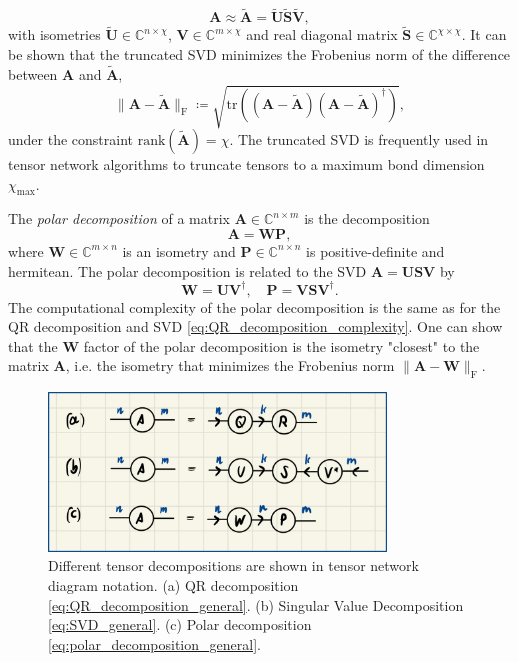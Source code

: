 \begin{equation}
	\label{eq:truncated_SVD_general}
	\bm{A} \approx \tilde{\bm{A}} = \tilde{\bm{U}}\tilde{\bm{S}}\tilde{\bm{V}},
\end{equation}
with isometries $\tilde{\bm{U}}\in\mathbb{C}^{n\times\chi}$, $\bm{V}\in\mathbb{C}^{m\times\chi}$ and real diagonal matrix $\tilde{\bm{S}}\in\mathbb{C}^{\chi\times\chi}$. It can be shown \cite{cite:eckart_young_theorem} that the truncated SVD minimizes the Frobenius norm of the difference between $\bm{A}$ and $\tilde{\bm{A}}$,
\begin{equation}
	\lVert \bm{A} - \bm{\tilde{A}} \rVert_\text{F} \coloneqq \sqrt{\text{tr}\left(\left(\bm{A}-\tilde{\bm{A}}\right)\left(\bm{A}-\tilde{\bm{A}}\right)^\dagger\right)},
\end{equation}
under the constraint $\text{rank}(\tilde{\bm{A}}) = \chi$. The truncated SVD is frequently used in tensor network algorithms to truncate tensors to a maximum bond dimension $\chi_\text{max}$. \par
The \textit{polar decomposition} of a matrix $\bm{A} \in \mathbb{C}^{n\times m}$ is the decomposition
\begin{equation}
	\label{eq:polar_decomposition_general}
	\bm{A} = \bm{W}\bm{P},
\end{equation}
where $\bm{W}\in\mathbb{C}^{m\times n}$ is an isometry and $\bm{P}\in\mathbb{C}^{n\times n}$ is positive-definite and hermitean. The polar decomposition is related to the SVD $\bm{A} = \bm{U}\bm{S}\bm{V}$ by
\begin{equation}
	\label{eq:polar_decomposition_connection_to_svd}
	\bm{W} = \bm{U}\bm{V}^\dagger, \quad \bm{P} = \bm{V}\bm{S}\bm{V}^\dagger.
\end{equation}
The computational complexity of the polar decomposition is the same as for the QR decomposition and SVD \eqref{eq:QR_decomposition_complexity}. One can show  that the $\bm{W}$ factor of the polar decomposition is the isometry "closest" to the matrix $\bm{A}$, i.e. the isometry that minimizes the Frobenius norm $\lVert\bm{A}-\bm{W}\rVert_\text{F}$.
\begin{figure}
	\centering
	\includegraphics[width=0.8\textwidth]{figures/Tensor_Networks/tensor_decomposition_diagrams.jpeg}
	\caption{Different tensor decompositions are shown in tensor network diagram notation. (a) QR decomposition \eqref{eq:QR_decomposition_general}. (b) Singular Value Decomposition \eqref{eq:SVD_general}. (c) Polar decomposition \eqref{eq:polar_decomposition_general}.}
	\label{fig:isometries_and_unitaries_diagrams}
\end{figure}
